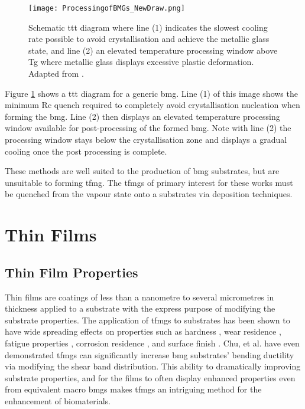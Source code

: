 \documentclass[a4paper,12pt,oneside]{report}%
\begin{document}
\begin{figure}[htb]
	\centering
	\texttt{[image: ProcessingofBMGs\_NewDraw.png]}
	\caption[Schematic \acrshort{ttt} diagram where line (1) indicates the slowest cooling rate possible to avoid crystallisation and achieve the metallic glass state, and line (2) an elevated temperature processing window above \acrshort{Tg} where metallic glass displays excessive plastic deformation.]{Schematic \acrshort{ttt} diagram where line (1) indicates the slowest cooling rate possible to avoid crystallisation and achieve the metallic glass state, and line (2) an elevated temperature processing window above \acrshort{Tg} where metallic glass displays excessive plastic deformation. Adapted from \cite{Schroers2010}.}
	\label{fig:BMGTTT}
\end{figure}

Figure \ref{fig:BMGTTT} shows a \gls{ttt} diagram for a generic \gls{bmg}. Line (1) of this image shows the minimum \gls{Rc} quench required to completely avoid crystallisation nucleation when forming the \gls{bmg}. Line (2) then displays an elevated temperature processing window available for post-processing of the formed \gls{bmg}. Note with line (2) the processing window stays below the crystallisation zone and displays a gradual cooling once the post processing is complete.

These methods are well suited to the production of \gls{bmg} substrates, but are unsuitable to forming \gls{tfmg}. The \glspl{tfmg} of primary interest for these works must be quenched from the vapour state onto a substrates via deposition techniques.

\section{Thin Films}
\subsection{Thin Film Properties}
Thin films are coatings of less than a nanometre to several micrometres in thickness applied to a substrate with the express purpose of modifying the substrate properties. The application of \glspl{tfmg} to substrates has been shown to have wide spreading effects on properties such as hardness \cite{Chu2012},  wear residence \cite{Liu2009, Prakash2005}, fatigue properties \cite{Chiang2006, Chu2011}, corrosion residence \cite{Chu2009}, and surface finish \cite{Liu2009, Chiang2006, Chu2011, Tsai2012}. Chu, et al. \cite{Chu2012} have even demonstrated \glspl{tfmg} can significantly increase \gls{bmg} substrates' bending ductility via modifying the shear band distribution. This ability to dramatically improving substrate properties, and for the films to often display enhanced properties even from equivalent macro \glspl{bmg} makes \glspl{tfmg} an intriguing method for the enhancement of biomaterials.
\end{document}
